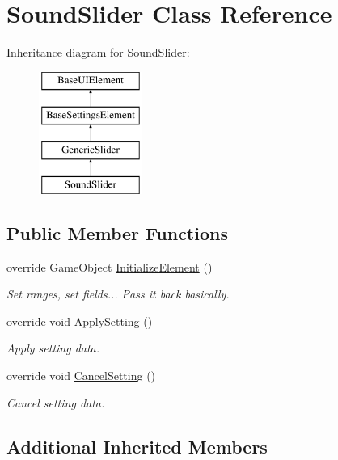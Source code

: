 \hypertarget{class_sound_slider}{}\section{Sound\+Slider Class Reference}
\label{class_sound_slider}
Inheritance diagram for Sound\+Slider\+:\begin{figure}[H]
\begin{center}
\leavevmode
\includegraphics[height=4.000000cm]{class_sound_slider}
\end{center}
\end{figure}
\subsection*{Public Member Functions}
\begin{DoxyCompactItemize}
\item 
override Game\+Object \hyperlink{class_sound_slider_a49202c614f0626d21bf6d086090c0720}{Initialize\+Element} ()
\begin{DoxyCompactList}\small\item\em Set ranges, set fields... Pass it back basically. \end{DoxyCompactList}\item 
override void \hyperlink{class_sound_slider_aad9aa2977723d011072ca8bd66b15ee2}{Apply\+Setting} ()
\begin{DoxyCompactList}\small\item\em Apply setting data. \end{DoxyCompactList}\item 
override void \hyperlink{class_sound_slider_a1f3ee8365022affae12b8e4866ed4db2}{Cancel\+Setting} ()
\begin{DoxyCompactList}\small\item\em Cancel setting data. \end{DoxyCompactList}\end{DoxyCompactItemize}
\subsection*{Additional Inherited Members}


